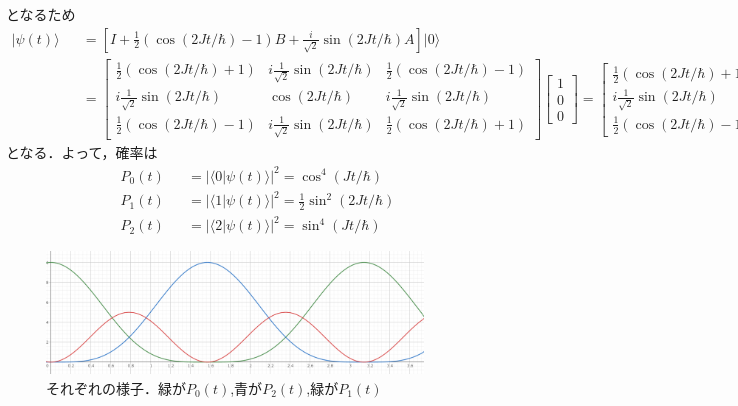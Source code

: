 \documentclass[12pt,dvipdfmx]{jsarticle}
\begin{document}
となるため
\begin{eqnarray}
  |\psi(t)\rangle &&= \left[  I + \frac{1}{2}\left( \cos(2J t/\hbar)-1 \right)B + \frac{i}{\sqrt{2}}\sin(2J t/\hbar)A \right]|0\rangle\\
  &&=
  \begin{bmatrix}
    \frac{1}{2}(\cos(2Jt/\hbar)+1) & i\frac{1}{\sqrt{2}} \sin(2Jt/\hbar) & \frac{1}{2}(\cos(2Jt/\hbar)-1)\\
    i \frac{1}{\sqrt{2}}\sin(2Jt/\hbar) & \cos(2Jt/\hbar) & i \frac{1}{\sqrt{2}}\sin(2Jt/\hbar)\\
    \frac{1}{2}(\cos(2Jt/\hbar)-1) & i \frac{1}{\sqrt{2}}\sin(2Jt/\hbar) & \frac{1}{2}(\cos(2Jt/\hbar)+1)
  \end{bmatrix}
  \begin{bmatrix}
    1\\
    0\\
    0
  \end{bmatrix}
  =
  \begin{bmatrix}
    \frac{1}{2}(\cos(2Jt/\hbar)+1) \\
    i \frac{1}{\sqrt{2}}\sin(2Jt/\hbar)\\
    \frac{1}{2}(\cos(2Jt/\hbar)-1) 
  \end{bmatrix}
\end{eqnarray}
となる．よって，確率は
\begin{eqnarray}
  P_0(t) &&= |\langle 0|\psi(t)\rangle|^2 = \cos^4(Jt/\hbar)\\
  P_1(t) &&= |\langle 1|\psi(t)\rangle|^2 =\frac{1}{2} \sin^2(2Jt/\hbar)\\
  P_2(t) &&= |\langle 2|\psi(t)\rangle|^2 = \sin^4(Jt/\hbar)
\end{eqnarray}

\begin{figure}[H]
  \begin{center}
  \includegraphics[width=100mm]{image.png}
  \caption{それぞれの様子．緑が$P_0(t)$,青が$P_2(t)$,緑が$P_1(t)$}
  \end{center}
\end{figure}
\end{document}
